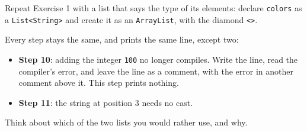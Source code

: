 Repeat Exercise 1 with a list that says the type of its elements: declare \texttt{colors} as a \texttt{List<String>} and create it as an \texttt{ArrayList}, with the diamond \texttt{<>}.

Every step stays the same, and prints the same line, except two:

\begin{itemize}

    \item \textbf{Step 10}: adding the integer \texttt{100} no longer compiles. Write the line, read the compiler's error, and leave the line as a comment, with the error in another comment above it. This step prints nothing.

    \item \textbf{Step 11}: the string at position 3 needs no cast.

\end{itemize}

Think about which of the two lists you would rather use, and why.
